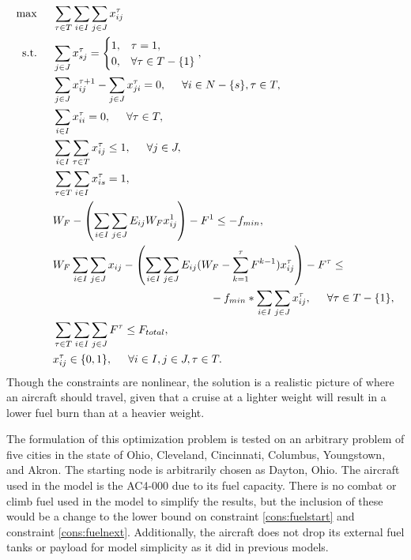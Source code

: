 \begin{align}
\max \hspace{0.5cm} & \sum_{\tau\in T}\sum_{i\in I}\sum_{j\in J}x_{ij}^\tau\\
\text{s.t.}\hspace{0.5cm}&\sum_{j\in J} x_{sj}^{\tau} = \begin{cases} 
1, & \tau = 1,\\
0, & \forall\tau\in T-\{1\} \end{cases}, \\
&\sum_{j\in J} x_{ij}^{\tau+1}-\sum_{j\in J}x^{\tau}_{ji} = 0, \hspace{0.5cm} \forall i\in N-\{s\},\tau \in T, \\
&\sum_{i\in I}x_{ii}^{\tau} = 0, \hspace{0.5cm} \forall \tau \in T, \\
&\sum_{i\in I}\sum_{\tau\in T} x_{ij}^\tau\leq 1, \hspace{0.5cm} \forall j \in J,\\
&\sum_{\tau\in T}\sum_{i\in I} x_{is}^\tau = 1,\\
&W_F-\left(\sum_{i\in I}\sum_{j\in J}E_{ij}W_Fx_{ij}^1\right) - F^{1}\leq -f_{min}, \\
&W_F\sum_{i\in I}\sum_{j\in J}x_{ij}-\left(\sum_{i\in I}\sum_{j\in J}E_{ij}(W_F-\sum_{k = 1}^{\tau}F^{k-1})x_{ij}^{\tau}\right) - F^{\tau}\leq \nonumber\\
&\hspace{5cm}-f_{min}*\sum_{i\in I}\sum_{j\in J}x_{ij}^\tau, \hspace{.5cm} \forall \tau \in T-\{1\},\\
&\sum_{\tau\in T}\sum_{i\in I}\sum_{j\in J} F^{\tau} \leq F_{total},\\
&x_{ij}^{\tau}\in \{0,1\}, \hspace{0.5cm} \forall i\in I,j\in J,\tau\in T.
\end{align}
Though the constraints are nonlinear, the solution is a realistic picture of where an aircraft should travel, given that a cruise at a lighter weight will result in a lower fuel burn than at a heavier weight. \par
The formulation of this optimization problem is tested on an arbitrary problem of five cities in the state of Ohio, Cleveland, Cincinnati, Columbus, Youngstown, and Akron. The starting node is arbitrarily chosen as Dayton, Ohio. The aircraft used in the model is the AC4-000 due to its fuel capacity. There is no combat or climb fuel used in the model to simplify the results, but the inclusion of these would be a change to the lower bound on constraint \eqref{cons:fuelstart} and constraint \eqref{cons:fuelnext}. Additionally, the aircraft does not drop its external fuel tanks or payload for model simplicity as it did in previous models.\par
